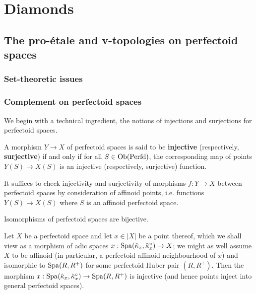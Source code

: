 \section{Diamonds}
    \subsection{The pro-\'etale and v-topologies on perfectoid spaces}
        \subsubsection{Set-theoretic issues}
        
        \subsubsection{Complement on perfectoid spaces}
            We begin with a technical ingredient, the notions of injections and surjections for perfectoid spaces. 
            \begin{definition} \label{def: injections_and_surjections_between_perfectoid_spaces}
                A morphism $Y \to X$ of perfectoid spaces is said to be \textbf{injective} (respectively, \textbf{surjective}) if and only if for all $S \in \mathrm{Ob}(\mathrm{Perfd})$, the corresponding map of points $Y(S) \to X(S)$ is an injective (respectively, surjective) function.
            \end{definition}
            \begin{remark}
                It suffices to check injectivity and surjectivity of morphisms $f: Y \to X$ between perfectoid spaces by consideration of affinoid points, i.e. functions $Y(S) \to X(S)$ where $S$ is an affinoid perfectoid space. 
            \end{remark}
            \begin{remark}
                Isomorphisms of perfectoid spaces are bijective.
            \end{remark}
            \begin{example}[Points]
                Let $X$ be a perfectoid space and let $x \in |X|$ be a point thereof, which we shall view as a morphism of adic spaces $x: \mathrm{Spa}(\hat{\kappa}_x, \hat{\kappa}_x^{\circ}) \to X$; we might as well assume $X$ to be affinoid (in particular, a perfectoid affinoid neighbourhood of $x$) and isomorphic to $\mathrm{Spa}(R, R^+)$ for some perfectoid Huber pair $(R, R^+)$. Then the morphism $x: \mathrm{Spa}(\hat{\kappa}_x, \hat{\kappa}_x^{\circ}) \to \mathrm{Spa}(R, R^+)$ is injective (and hence points inject into general perfectoid spaces).
            \end{example}
